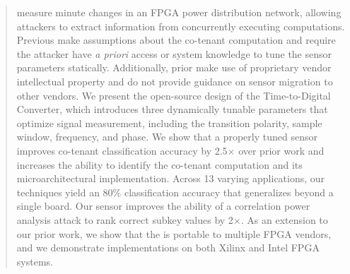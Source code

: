 \begin{abstract}
\Sensors measure minute changes in an FPGA power distribution network, allowing attackers to extract information from concurrently executing computations. Previous \sensors make assumptions about the co-tenant computation and require the attacker have \textit{a priori} access or system knowledge to tune the sensor parameters statically. Additionally, prior \sensors make use of proprietary vendor intellectual property and do not provide guidance on sensor migration to other vendors. We present the open-source design of the \name Time-to-Digital Converter, which introduces three dynamically tunable parameters that optimize signal measurement, including the transition polarity, sample window, frequency, and phase. %
We show that a properly tuned sensor improves co-tenant classification accuracy by 2.5$\times$ over prior work and increases the ability to identify the co-tenant computation and its microarchitectural implementation. Across 13 varying applications, our techniques yield an 80\% classification accuracy that generalizes beyond a single board. Our sensor improves the ability of a correlation power analysis attack to rank correct subkey values by 2$\times$. As an extension to our prior work, we show that the \sensor is portable to multiple FPGA vendors, and we demonstrate implementations on both Xilinx and Intel FPGA systems.




\end{abstract}
